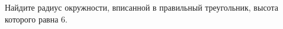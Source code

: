 \begin{ex}
	\begin{condition}
		Найдите радиус окружности, вписанной в правильный треугольник, высота которого равна \( 6 \).
	\end{condition}
\end{ex}
